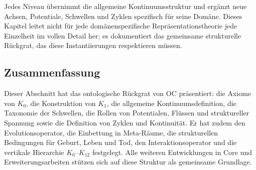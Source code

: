 Jedes Niveau übernimmt die allgemeine Kontinuumsstruktur und ergänzt neue
Achsen, Potentiale, Schwellen und Zyklen spezifisch für seine Domäne.
Dieses Kapitel leitet nicht für jede domänenspezifische Repräsentationstheorie
jede Einzelheit im vollen Detail her; es dokumentiert das gemeinsame
strukturelle Rückgrat, das diese Instantiierungen respektieren müssen.

\subsection{Zusammenfassung}

Dieser Abschnitt hat das ontologische Rückgrat von OC präsentiert: die Axiome von
\(K_0\), die Konstruktion von \(K_1\), die allgemeine Kontinuumsdefinition,
die Taxonomie der Schwellen, die Rollen von Potentialen, Flüssen und
struktureller Spannung sowie die Definition von Zyklen und Kontinuität.
Er hat zudem den Evolutionsoperator, die Einbettung in Meta-Räume,
die strukturellen Bedingungen für Geburt, Leben und Tod, den Interaktionsoperator
und die vertikale Hierarchie \(K_0\)–\(K_{12}\) festgelegt.
Alle weiteren Entwicklungen in Core und Erweiterungsarbeiten stützen sich auf
diese Struktur als gemeinsame Grundlage.

